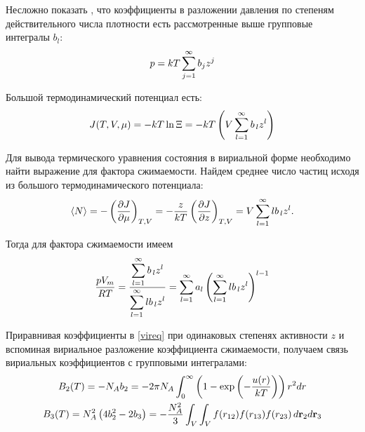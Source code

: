 Несложно показать \cite{meyson}, что коэффициенты в разложении давления по степеням действительного числа плотности есть рассмотренные выше групповые интегралы $b_l$: 
\vverh
\begin{gather}
	p = k T \sum_{j=1}^\infty b_j z^j \notag
\end{gather}

Большой термодинамический потенциал есть:
\vverh
\begin{gather}
	J(T, V, \mu) = - k T \ln \Xi = -k T \left( V \sum_{l=1}^\infty b_{\, l} z^l \right) \notag
\end{gather}

Для вывода термического уравнения состояния в вириальной форме необходимо найти выражение для фактора сжимаемости. Найдем среднее число частиц исходя из большого термодинамического потенциала:
\vverh
\begin{gather}
	\langle N \rangle = - \left( \frac{\partial J}{\partial \mu} \right)_{T, V} = - \frac{z}{kT} \left( \frac{\partial J}{\partial z} \right)_{T, V} = V \sum_{l = 1}^\infty l b_{\, l} z^l. \notag
\end{gather}

Тогда для фактора сжимаемости имеем
\vverh
\begin{gather}
	\frac{p V_m}{RT} = \frac{\displaystyle \sum_{l = 1}^\infty b_{\, l} z^l}{\displaystyle \sum_{l = 1}^\infty l b_{\, l} z^l} = \sum_{l = 1}^\infty a_l \left( \sum_{l = 1}^\infty  l b_{\, l} z^l \right)^{l - 1} \label{vireq}
\end{gather}

Приравнивая коэффициенты в \eqref{vireq} при одинаковых степенях активности $z$ и вспоминая вириальное разложение коэффициента сжимаемости, получаем связь вириальных коэффициентов с групповыми интегралами:
\vverh
\begin{gather}
	B_2(T) = - N_A b_2 = - 2 \pi N_A \int_0^\infty \left( 1 - \exp \left( -\frac{u(r)}{kT} \right) \right) r^2 d r \notag  \\
	B_3(T) = N_A^2 \left( 4 b_2^2 - 2 b_3 \right) = - \frac{N_A^2}{3} \int_V \int_V f(r_{12}) f(r_{13}) f(r_{23}) \, d \mathbf{r}_2 d \mathbf{r}_3 \notag
\end{gather}

